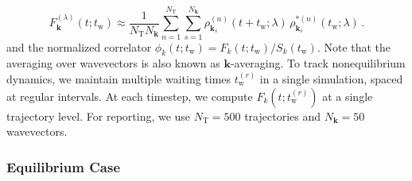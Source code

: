 \begin{equation}
F_{\bm k}^{(\lambda)}(t;t_\mathrm{w}) \approx  \frac{1}{N_\mathrm{T} N_{\bm k}} \sum_{n=1}^{N_\mathrm{T}} \sum_{s=1}^{N_{\bm k}}
\rho_{\bm k_s}^{(n)}(t+t_\mathrm{w}; \lambda)\,\rho_{\bm k_s}^{*(n)}(t_\mathrm{w}; \lambda) \,.
\label{eq:Fk_NEQ_fixed}
\end{equation}
and the normalized correlator $\phi_{k}(t;t_\mathrm{w}) = F_{k}(t;t_\mathrm{w})/S_{k}(t_\mathrm{w})$. Note that the averaging over wavevectors is also known as $\bm k$-averaging. 
To track nonequilibrium dynamics, we maintain multiple waiting times $t_\mathrm{w}^{(r)}$ in a single simulation, spaced at regular intervals. At each timestep, we compute $F_{k}(t;t_\mathrm{w}^{(r)})$ at a single trajectory level. For reporting, we use $N_\mathrm{T}=500$ trajectories and $N_{\bm k} = 50$ wavevectors. %

\subsubsection{Equilibrium Case}

